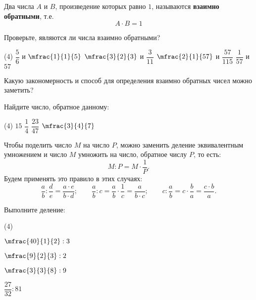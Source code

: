 \begin{class}[number=3]
	\begin{definit}
		Два числа \( A \) и \( B \), произведение которых равно \( 1 \), называются \textbf{взаимно обратными}, т.е.
		\[ A \cdot B = 1 \]
	\end{definit}
	\begin{listofex}
		\item Проверьте, являются ли числа взаимно обратными?
		\begin{tasks}(4)
			\task \( \dfrac{5}{6} \) и \( \mfrac{1}{1}{5} \)
			\task \( \mfrac{3}{2}{3} \) и \( \dfrac{3}{11} \)
			\task \( \mfrac{2}{1}{57} \) и \( \dfrac{57}{115} \)
			\task \( \dfrac{1}{57} \) и \( 57 \)
		\end{tasks}
		Какую закономерность и способ для определения взаимно обратных чисел можно заметить?
		\item Найдите число, обратное данному:
		\begin{tasks}(4)
			\task \( 15 \)
			\task \( \dfrac{1}{4} \)
			\task \( \dfrac{23}{47} \)
			\task \( \mfrac{3}{4}{7} \)
		\end{tasks}
	\end{listofex}
	\begin{definit}
		Чтобы поделить число \( M \) на число \( P \), можно заменить деление эквивалентным умножением и число \( M \) умножить на число, обратное числу \( P \), то есть:
		\[ M:P=M\cdot\dfrac{1}{P}. \]
		Будем применять это правило в этих случаях:
		\[ 
			\dfrac{a}{b}:\dfrac{d}{e}=\dfrac{a \cdot e}{b \cdot d};
			\qquad
			\dfrac{a}{b}:c=\dfrac{a}{b}\cdot\dfrac{1}{c}=\dfrac{a}{b \cdot c};
			\qquad
			c:\dfrac{a}{b}=c\cdot\dfrac{b}{a}=\dfrac{c \cdot b}{a}.
		\]
	\end{definit}
	\begin{listofex}
		\item Выполните деление:
		\begin{tasks}(4)
			\item \( \mfrac{40}{1}{2}:3 \)
			\item \( \mfrac{9}{2}{3}:2 \)
			\item \( \mfrac{3}{3}{8}:9 \)
			\item \( \dfrac{27}{32}:81 \)
		\end{tasks}

\end{listofex}
\end{class}
